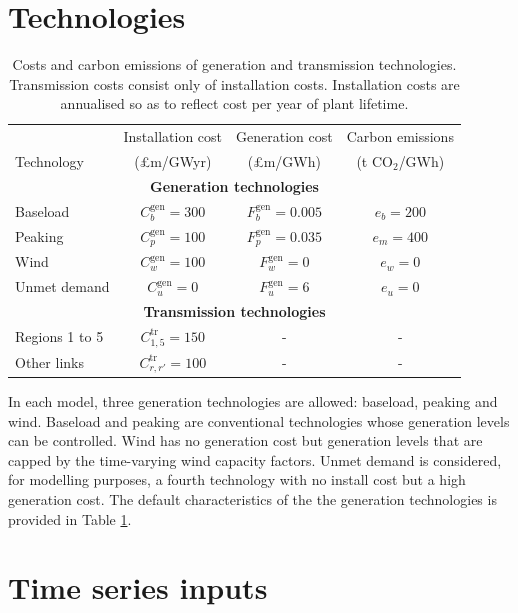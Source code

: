\documentclass[preprint]{elsarticle}
\begin{document}
\newpage
\section{Technologies}
\begin{table}
  \centering
\begin{tabular}{ l  c  c  c}
\small
& Installation cost & Generation cost & Carbon emissions\\
Technology &(\pounds m/GWyr) &(\pounds m/GWh) & (t CO$_2$/GWh) \\ \hline
\multicolumn{4}{c}{\textbf{Generation technologies}} \\  
Baseload & $C_b^\text{gen} = 300$ & $F_b^\text{gen} = 0.005$ & $e_b = 200$ \\
Peaking & $C_p^\text{gen} = 100$ & $F_p^\text{gen} = 0.035$ & $e_m = 400$ \\
Wind & $C_w^\text{gen} = 100$ & $F_w^\text{gen} = 0$ & $e_w = 0$ \\
Unmet demand & $C_u^\text{gen} = 0$ & $F_u^\text{gen} = 6$ & $e_u = 0$ \\
\multicolumn{4}{c}{\textbf{Transmission technologies}} \\  
Regions 1 to 5 & $C_{1,5}^\text{tr} = 150$ & - & - \\
Other links & $C_{r,r'}^\text{tr} = 100$ & - & - \\ \hline
\end{tabular} \vspace{1em}
\caption{Costs and carbon emissions of generation and transmission technologies. Transmission costs consist only of installation costs. Installation costs are annualised so as to reflect cost per year of plant lifetime.}
\label{table:tech_characteristics}
\end{table}

\noindent In each model, three generation technologies are allowed: baseload, peaking and wind. Baseload and peaking are conventional technologies whose generation levels can be controlled. Wind has no generation cost but generation levels that are capped by the time-varying wind capacity factors. Unmet demand is considered, for modelling purposes, a fourth technology with no install cost but a high generation cost. The default characteristics of the the generation technologies is provided in Table \ref{table:tech_characteristics}. \\




\section{Time series inputs}
\end{document}
